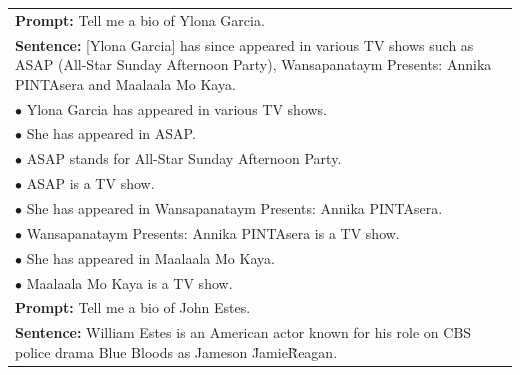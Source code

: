 \begin{table}[t]
    \myfontsize \setlength{\tabcolsep}{0em}
    \centering
    \begin{tabular}{p{7.6cm}}
        \toprule
        \textbf{Prompt:} Tell me a bio of Ylona Garcia. \\
        \textbf{Sentence:} [Ylona Garcia] has since appeared in various TV shows such as ASAP (All-Star Sunday Afternoon Party), Wansapanataym Presents: Annika PINTAsera and Maalaala Mo Kaya. \\
        $\mathbf{\bullet}$ Ylona Garcia has appeared in various TV shows. \myblue{\sLabel} \\
        $\mathbf{\bullet}$ She has appeared in ASAP. \myblue{\sLabel}  \\
        $\mathbf{\bullet}$ ASAP stands for All-Star Sunday Afternoon Party. \myblue{\sLabel} \\
        $\mathbf{\bullet}$ ASAP is a TV show. \myblue{\sLabel}\\
        $\mathbf{\bullet}$ She has appeared in Wansapanataym Presents: Annika PINTAsera. \mypurple{\nsLabel}\\
        $\mathbf{\bullet}$ Wansapanataym Presents: Annika PINTAsera is a TV show.  \mypink{\irLabel} \\
        $\mathbf{\bullet}$ She has appeared in Maalaala Mo Kaya.  \mypurple{\nsLabel} \\
        $\mathbf{\bullet}$ Maalaala Mo Kaya is a TV show. \mypink{\irLabel} \\
        \midrule
        \textbf{Prompt:} Tell me a bio of John Estes.\\
        \textbf{Sentence:} William Estes is an American actor known for his role on CBS police drama Blue Bloods as Jameson \"Jamie\" Reagan. \\

\end{tabular}
\end{table}
